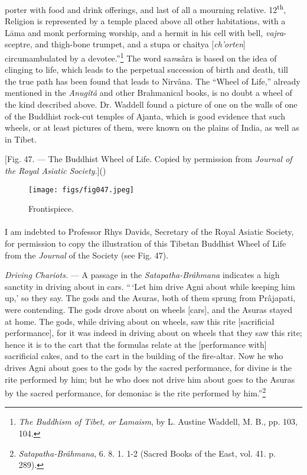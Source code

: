 \documentclass[a4paper, 11pt, oneside, polutonikogreek, english]{article}
\begin{document}
porter with food and drink offerings, and last of all a mourning relative. 12\textsuperscript{th}, Religion is represented by a temple placed above all other habitations, with a Lāma and monk performing worship, and a hermit in his cell with bell, \emph{vajra}-sceptre, and thigh-bone trumpet, and a stupa or chaitya [\emph{ch'orten}] circumambulated by a devotee.''\footnote{\emph{The Buddhism of Tibet, or Lamaism}, by L. Austine Waddell, M. B., pp. 103, 104.} The word sa\emph{m}sâra is based on the idea of clinging to life, which leads to the perpetual succession of birth and death, till the true path has been found that leads to Nirvâna. The ``Wheel of Life,'' already mentioned in the \emph{Anugîtâ} and other Brahmanical books, is no doubt a wheel of the kind described above. Dr. Waddell found a picture of one on the walls of one of the Buddhist rock-cut temples of Ajanta, which is good evidence that such wheels, or at least pictures of them, were known on the plains of India, as well as in Tibet.

[Fig. 47. --- The Buddhist Wheel of Life. Copied by permission from \emph{Journal of the Royal Asiatic Society}.]()
\begin{figure}[H]
\centering
\texttt{[image: figs/fig047.jpeg]}
\caption{Frontispiece.}
\end{figure}
\paragraph{}
I am indebted to Professor Rhys Davids, Secretary of the Royal Asiatic Society, for permission to copy the illustration of this Tibetan Buddhist Wheel of Life from the \emph{Journal} of the Society (see Fig. 47).

\emph{Driving Chariots.} --- A passage in the \emph{Satapatha-Brâhmana} indicates a high sanctity in driving about in cars. ``\,`Let him drive Agni about while keeping him up,' so they say. The gods and the Asuras, both of them sprung from Prâjapati, were contending. The gods drove about on wheels [cars], and the Asuras stayed at home. The gods, while driving about on wheels, saw this rite [sacrificial performance], for it was indeed in driving about on wheels that they saw this rite; hence it is to the cart that the formulas relate at the [performance with] sacrificial cakes, and to the cart in the building of the fire-altar. Now he who drives Agni about goes to the gods by the sacred performance, for divine is the rite performed by him; but he who does not drive him about goes to the Asuras by the sacred performance, for demoniac is the rite performed by him.''\footnote{\emph{Satapatha-Brâhmana}, 6. 8. 1. 1-2 (Sacred Books of the East, vol. 41. p. 289).}
\end{document}

